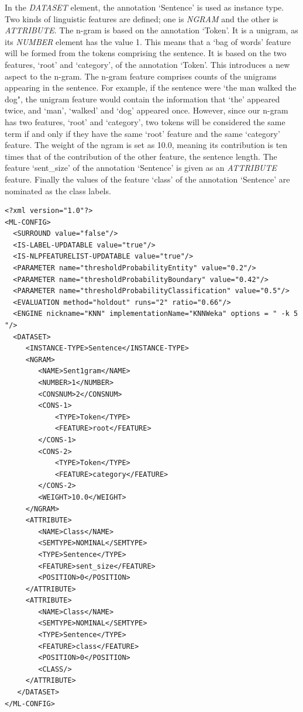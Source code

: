 In the {\em DATASET} element, the annotation `Sentence' is used as instance
type. Two kinds of linguistic features are defined; one is {\em NGRAM} and the
other is {\em ATTRIBUTE}. The n-gram is based on the annotation `Token'. It is
a unigram, as its {\em NUMBER} element has the value 1. This means that a `bag
of words' feature will be formed from the tokens comprising the sentence. It is
based on the two features, `root' and `category', of the annotation
`Token'. This introduces a new aspect to the n-gram. The n-gram feature
comprises counts of the unigrams appearing in the sentence. For example, if the
sentence were `the man walked the dog", the unigram feature would contain the
information that `the' appeared twice, and `man', `walked' and `dog'
appeared once. However, since our n-gram has two features, `root' and
`category', two tokens will be considered the same term if and only if they
have the same `root' feature and the same `category' feature. The weight of
the ngram is set as 10.0, meaning its contribution is ten times that of the
contribution of the other feature, the sentence length. The feature
`sent\_size' of the annotation `Sentence' is given as an {\em ATTRIBUTE}
feature. Finally the values of the feature `class' of the annotation
`Sentence' are nominated as the class labels.

\vspace{0.2cm}
\begin{small}\begin{verbatim}
<?xml version="1.0"?>
<ML-CONFIG>
  <SURROUND value="false"/>
  <IS-LABEL-UPDATABLE value="true"/>
  <IS-NLPFEATURELIST-UPDATABLE value="true"/>
  <PARAMETER name="thresholdProbabilityEntity" value="0.2"/>
  <PARAMETER name="thresholdProbabilityBoundary" value="0.42"/>
  <PARAMETER name="thresholdProbabilityClassification" value="0.5"/>
  <EVALUATION method="holdout" runs="2" ratio="0.66"/>
  <ENGINE nickname="KNN" implementationName="KNNWeka" options = " -k 5 "/>
  <DATASET>
     <INSTANCE-TYPE>Sentence</INSTANCE-TYPE>
     <NGRAM>
        <NAME>Sent1gram</NAME>
        <NUMBER>1</NUMBER>
        <CONSNUM>2</CONSNUM>
        <CONS-1>
            <TYPE>Token</TYPE>
            <FEATURE>root</FEATURE>
        </CONS-1>
        <CONS-2>
            <TYPE>Token</TYPE>
            <FEATURE>category</FEATURE>
        </CONS-2>
        <WEIGHT>10.0</WEIGHT>                                    
     </NGRAM>
     <ATTRIBUTE>
        <NAME>Class</NAME>
        <SEMTYPE>NOMINAL</SEMTYPE>
        <TYPE>Sentence</TYPE>
        <FEATURE>sent_size</FEATURE>
        <POSITION>0</POSITION>
     </ATTRIBUTE>           
     <ATTRIBUTE>
        <NAME>Class</NAME>
        <SEMTYPE>NOMINAL</SEMTYPE>
        <TYPE>Sentence</TYPE>
        <FEATURE>class</FEATURE>
        <POSITION>0</POSITION>
        <CLASS/>
     </ATTRIBUTE>
   </DATASET>
</ML-CONFIG>
\end{verbatim}\end{small}
\vspace{0.5cm}

